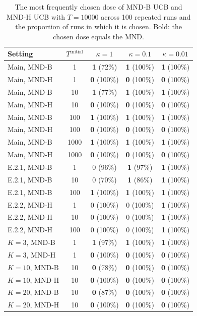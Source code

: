 \begin{table}[tb]
\centering
\caption{The most frequently chosen dose of MND-B UCB and MND-H UCB with $T=10000$ across 100 repeated runs and the proportion of runs in which it is chosen. Bold: the chosen dose equals the MND.}
\label{tab:ident}
\small
\begin{tabular}{lcccc}
\hline
Setting & $T^{\text{initial}}$ & $\kappa=1$ & $\kappa=0.1$ & $\kappa=0.01$ \\
\hline
Main, MND-B & 1 & \textbf{1} (72\%) & \textbf{1} (100\%) & \textbf{1} (100\%) \\
Main, MND-H & 1 & \textbf{0} (100\%) & \textbf{0} (100\%) & \textbf{0} (100\%) \\
Main, MND-B & 10 & \textbf{1} (77\%) & \textbf{1} (100\%) & \textbf{1} (100\%) \\
Main, MND-H & 10 & \textbf{0} (100\%) & \textbf{0} (100\%) & \textbf{0} (100\%) \\
Main, MND-B & 100 & \textbf{1} (100\%) & \textbf{1} (100\%) & \textbf{1} (100\%) \\
Main, MND-H & 100 & \textbf{0} (100\%) & \textbf{0} (100\%) & \textbf{0} (100\%) \\
Main, MND-B & 1000 & \textbf{1} (100\%) & \textbf{1} (100\%) & \textbf{1} (100\%) \\
Main, MND-H & 1000 & \textbf{0} (100\%) & \textbf{0} (100\%) & \textbf{0} (100\%) \\
E.2.1, MND-B & 1 & 0 (96\%) & \textbf{1} (97\%) & \textbf{1} (100\%) \\
E.2.1, MND-B & 10 & 0 (70\%) & \textbf{1} (86\%) & \textbf{1} (100\%) \\
E.2.1, MND-B & 100 & \textbf{1} (100\%) & \textbf{1} (100\%) & \textbf{1} (100\%) \\
E.2.2, MND-H & 1 & 0 (100\%) & 0 (100\%) & \textbf{1} (100\%) \\
E.2.2, MND-H & 10 & 0 (100\%) & 0 (100\%) & \textbf{1} (100\%) \\
E.2.2, MND-H & 100 & 0 (100\%) & 0 (100\%) & \textbf{1} (100\%) \\
$K=3$, MND-B & 1 & \textbf{1} (97\%) & \textbf{1} (100\%) & \textbf{1} (100\%) \\
$K=3$, MND-H & 1 & \textbf{0} (100\%) & \textbf{0} (100\%) & \textbf{0} (100\%) \\
$K=10$, MND-B & 10 & \textbf{0} (78\%) & \textbf{0} (100\%) & \textbf{0} (100\%) \\
$K=10$, MND-H & 10 & \textbf{0} (100\%) & \textbf{0} (100\%) & \textbf{0} (100\%) \\
$K=20$, MND-B & 10 & \textbf{0} (87\%) & \textbf{0} (100\%) & \textbf{0} (100\%) \\
$K=20$, MND-H & 10 & \textbf{0} (100\%) & \textbf{0} (100\%) & \textbf{0} (100\%) \\
\hline
\end{tabular}
\end{table}

